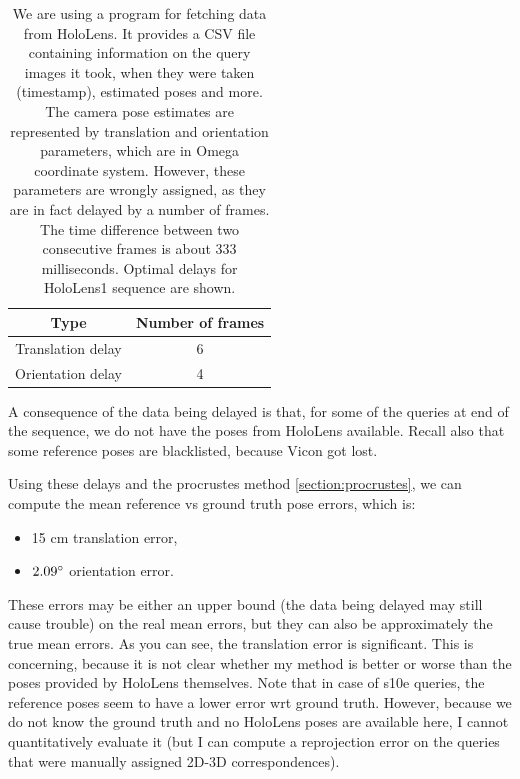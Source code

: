 \documentclass[twoside]{ctuthesis}
\theoremstyle{plain}
\theoremstyle{definition}
\theoremstyle{note}
\begin{document}
\begin{table}[ht]
    \centering
    {\footnotesize
	\begin{tabular}{|c|c|}
	\hline
	Type & Number of frames \\[1pt]
	\hline
	Translation delay & 6 \\[1pt]
	Orientation delay & 4 \\[1pt]
	\hline
    \end{tabular}
	\caption{We are using a program \cite{HoloLensDataAcquisition} for fetching data from HoloLens. It provides a CSV file containing information on the query images it took, when they were taken (timestamp), estimated poses and more. The camera pose estimates are represented by translation and orientation parameters, which are in Omega coordinate system. However, these parameters are wrongly assigned, as they are in fact delayed by a number of frames. The time difference between two consecutive frames is about 333 milliseconds. Optimal delays for HoloLens1 sequence are shown.}
	\label{tab:HL-pose-delays}
    }
\end{table}

A consequence of the data being delayed is that, for some of the queries at end of the sequence, we do not have the poses from HoloLens available. Recall also that some reference poses are blacklisted, because Vicon got lost.

Using these delays and the procrustes method \ref{section:procrustes}, we can compute the mean reference vs ground truth pose errors, which is:

\begin{itemize}
	\item 15 cm translation error,
	\item $2.09\degree$ orientation error.
\end{itemize}

These errors may be either an upper bound (the data being delayed may still cause trouble) on the real mean errors, but they can also be approximately the true mean errors. As you can see, the translation error is significant. This is concerning, because it is not clear whether my method is better or worse than the poses provided by HoloLens themselves. Note that in case of s10e queries, the reference poses seem to have a lower error wrt ground truth. However, because we do not know the ground truth and no HoloLens poses are available here, I cannot quantitatively evaluate it (but I can compute a reprojection error on the queries that were manually assigned 2D-3D correspondences).
\end{document}
